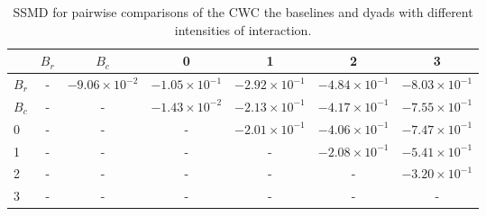 \begin{table}
\centering
\caption{SSMD for pairwise comparisons of the CWC the baselines and dyads with different intensities of interaction.}
\label{tab:ssmd_coherence}
\begin{tabular}{lcccccc}
\toprule
 & $B_r$ & $B_c$ & 0 & 1 & 2 & 3 \\
\midrule
$B_r$ & - & $-9.06 \times 10^{-2}$ & $-1.05 \times 10^{-1}$ & $-2.92 \times 10^{-1}$ & $-4.84 \times 10^{-1}$ & $-8.03 \times 10^{-1}$ \\
$B_c$ & - & - & $-1.43 \times 10^{-2}$ & $-2.13 \times 10^{-1}$ & $-4.17 \times 10^{-1}$ & $-7.55 \times 10^{-1}$ \\
0 & - & - & - & $-2.01 \times 10^{-1}$ & $-4.06 \times 10^{-1}$ & $-7.47 \times 10^{-1}$ \\
1 & - & - & - & - & $-2.08 \times 10^{-1}$ & $-5.41 \times 10^{-1}$ \\
2 & - & - & - & - & - & $-3.20 \times 10^{-1}$ \\
3 & - & - & - & - & - & - \\
\bottomrule
\end{tabular}
\end{table}
